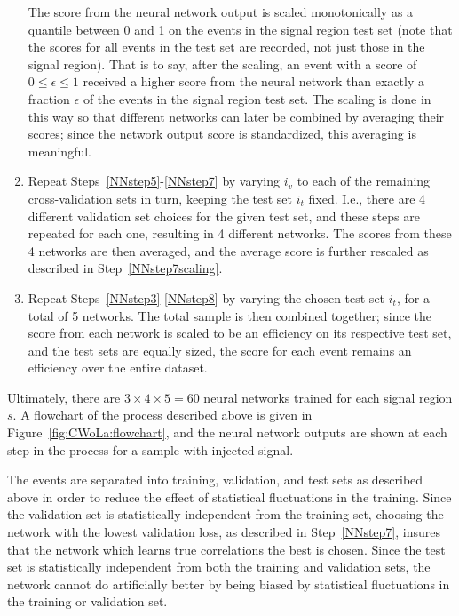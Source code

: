 \begin{enumerate}
  The score from the neural network output is scaled monotonically as a quantile between 0 and 1 on the events in the signal region test set (note that the scores for all events in the test set are recorded, not just those in the signal region).
  That is to say, after the scaling, an event with a score of $0 \le \epsilon \le 1$ received a higher score from the neural network than exactly a fraction $\epsilon$ of the events in the signal region test set.
  The scaling is done in this way so that different networks can later be combined by averaging their scores; since the network output score is standardized, this averaging is meaningful.
  \item Repeat Steps~\ref{NNstep5}-\ref{NNstep7} by varying $i_v$ to each of the remaining cross-validation sets in turn, keeping the test set $i_t$ fixed.
    I.e., there are 4 different validation set choices for the given test set, and these steps are repeated for each one, resulting in 4 different networks.
    The scores from these 4 networks are then averaged, and the average score is further rescaled as described in Step~\ref{NNstep7scaling}.
  \label{NNstep8}
  \item Repeat Steps~\ref{NNstep3}-\ref{NNstep8} by varying the chosen test set $i_t$, for a total of 5 networks.
  The total sample is then combined together; since the score from each network is scaled to be an efficiency on its respective test set, and the test sets are equally sized, the score for each event remains an efficiency over the entire dataset.
  \label{NNstep9}
\end{enumerate}

Ultimately, there are $3\times4\times5 = 60$ neural networks trained for each signal region $s$. A flowchart of the process described above is given in Figure~\ref{fig:CWoLa:flowchart}, and the neural network outputs are shown at each step in the process for a sample with injected signal.

The events are separated into training, validation, and test sets as described above in order to reduce the effect of statistical fluctuations in the training.
Since the validation set is statistically independent from the training set, choosing the network with the lowest validation loss, as described in Step~\ref{NNstep7}, insures that the network which learns true correlations the best is chosen.
Since the test set is statistically independent from both the training and validation sets, the network cannot do artificially better by being biased by statistical fluctuations in the training or validation set.

